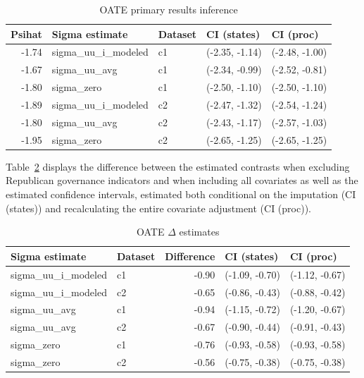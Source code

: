 \begin{table}[ht]
\centering
\caption{OATE primary results inference}
\label{tab:oateconfint}
\begin{tabular}{rllll}
  \hline
Psihat & Sigma estimate & Dataset & CI (states) & CI (proc) \\ 
  \hline
-1.74 & sigma\_uu\_i\_modeled & c1 & (-2.35, -1.14) & (-2.48, -1.00) \\ 
  -1.67 & sigma\_uu\_avg & c1 & (-2.34, -0.99) & (-2.52, -0.81) \\ 
  -1.80 & sigma\_zero & c1 & (-2.50, -1.10) & (-2.50, -1.10) \\ 
  -1.89 & sigma\_uu\_i\_modeled & c2 & (-2.47, -1.32) & (-2.54, -1.24) \\ 
  -1.80 & sigma\_uu\_avg & c2 & (-2.43, -1.17) & (-2.57, -1.03) \\ 
  -1.95 & sigma\_zero & c2 & (-2.65, -1.25) & (-2.65, -1.25) \\ 
   \hline
\end{tabular}
\end{table}

Table~\ref{tab:oaterepubdiff} displays the difference between the estimated contrasts when excluding Republican governance indicators and when including all covariates as well as the estimated confidence intervals, estimated both conditional on the imputation (CI (states)) and recalculating the entire covariate adjustment (CI (proc)).

\begin{table}[ht]
\centering
\caption{OATE $\hat{\Delta}$ estimates}
\label{tab:oaterepubdiff}
\begin{tabular}{llrll}
  \hline
Sigma estimate & Dataset & Difference & CI (states) & CI (proc) \\ 
  \hline
sigma\_uu\_i\_modeled & c1 & -0.90 & (-1.09, -0.70) & (-1.12, -0.67) \\ 
  sigma\_uu\_i\_modeled & c2 & -0.65 & (-0.86, -0.43) & (-0.88, -0.42) \\ 
  sigma\_uu\_avg & c1 & -0.94 & (-1.15, -0.72) & (-1.20, -0.67) \\ 
  sigma\_uu\_avg & c2 & -0.67 & (-0.90, -0.44) & (-0.91, -0.43) \\ 
  sigma\_zero & c1 & -0.76 & (-0.93, -0.58) & (-0.93, -0.58) \\ 
  sigma\_zero & c2 & -0.56 & (-0.75, -0.38) & (-0.75, -0.38) \\ 
   \hline
\end{tabular}
\end{table}

